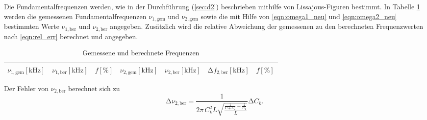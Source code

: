 Die Fundamentalfrequenzen werden, wie in der Durchführung (\ref{sec:d2}) beschrieben mithilfe von Lissajous-Figuren bestimmt.
In Tabelle \ref{tab:3} werden die gemessenen Fundamentalfrequenzen $\nu_{1,\text{gem}}$ und $\nu_{2,\text{gem}}$ sowie die mit Hilfe von \eqref{eqn:omega1_neu} und \eqref{eqn:omega2_neu} bestimmten Werte $\nu_{1,\text{ber}}$ und $\nu_{2,\text{ber}}$ angegeben.
Zusätzlich wird die relative Abweichung der gemessenen zu den berechneten Frequenzwerten nach \eqref{eqn:rel_err} berechnet und angegeben.
\begin{table}[H]
  \centering
  \caption{Gemessene und berechnete Frequenzen}
  \label{tab:3}
  \begin{tabular}{c c c c c c c}
    \toprule
    {$\nu_{1,\text{gem}} [\si{\kilo\hertz}]$} & {$\nu_{1,\text{ber}} [\si{\kilo\hertz}]$} & {$f [\%]$} & {$\nu_{2,\text{gem}} [\si{\kilo\hertz}]$} & {$\nu_{2,\text{ber}} [\si{\kilo\hertz}]$} & {$\increment f_{2,\text{ber}} [\si{\kilo\hertz}]$} & {$f [\%]$} \\
    \midrule
    
    \bottomrule
  \end{tabular}
\end{table}
Der Fehler von $\nu_{2,\text{ber}}$ berechnet sich zu
\begin{equation}
\increment{\nu_{2,\text{ber}}} = \frac{1}{2 \pi\, C_k^2 L \sqrt{ \frac{\frac{1}{C+C_s} + \frac{2}{C_k}}{L} } } \increment{C_k}.
\end{equation}
%
%
%
%
%
%    
%
%
